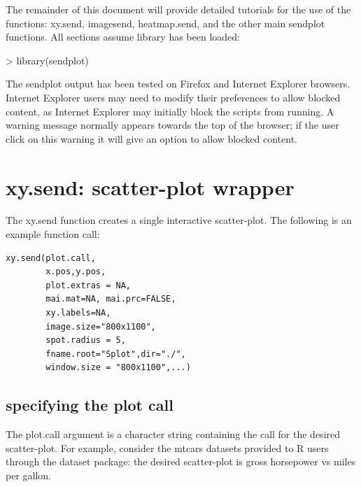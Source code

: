 \documentclass[]{article}
\begin{document}
\indent The remainder of this document will provide detailed tutorials for the use of the functions: xy.send, imagesend, heatmap.send, and the other main sendplot functions. All sections assume library has been loaded:

\begin{Schunk}
\begin{Sinput}
> library(sendplot)
\end{Sinput}
\end{Schunk}

\vskip5mm
 The sendplot output has been tested on Firefox and Internet Explorer browsers.  Internet Explorer users may need to modify their preferences to allow blocked content, as Internet Explorer may initially block the scripts from running. A warning message normally appears towards the top of the browser; if the user click on this warning it will give an option to allow blocked content.
































\section{xy.send: scatter-plot wrapper}

The xy.send function creates a single interactive scatter-plot. The following is an example function call:
\begin{verbatim}
xy.send(plot.call, 
        x.pos,y.pos,
        plot.extras = NA,
        mai.mat=NA, mai.prc=FALSE,
        xy.labels=NA,
        image.size="800x1100",
        spot.radius = 5,
        fname.root="Splot",dir="./",
        window.size = "800x1100",...)
 \end{verbatim}

\subsection{specifying the plot call}
The plot.call argument is a character string containing the call for the desired scatter-plot. For example, consider the mtcars datasets provided to R users through the dataset package: the desired scatter-plot is gross horsepower vs miles per gallon.
\end{document}
